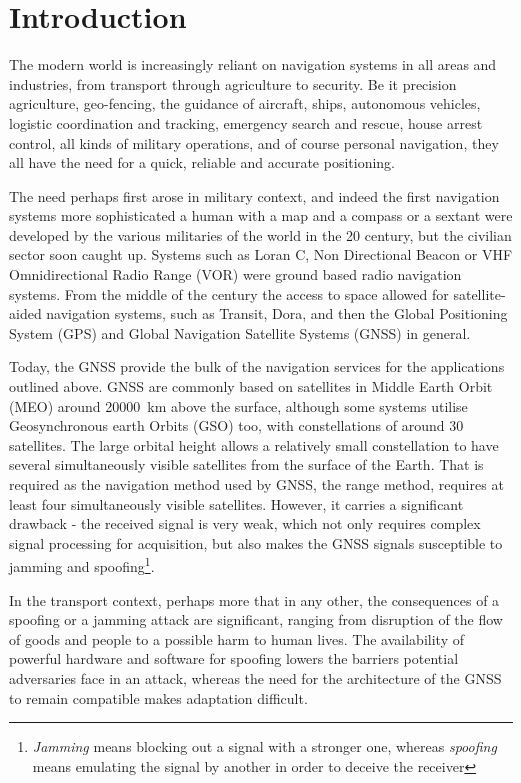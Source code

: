 \chapter{Introduction}
\label{s_int}
The modern world is increasingly reliant on navigation systems in all areas and industries, from transport through agriculture to security. Be it precision agriculture, geo-fencing, the guidance of aircraft, ships, autonomous vehicles, logistic coordination and tracking, emergency search and rescue, house arrest control, all kinds of military operations, and of course personal navigation, they all have the need for a quick, reliable and accurate positioning.

The need perhaps first arose in military context, and indeed the first navigation systems more sophisticated a human with a map and a compass or a sextant were developed by the various militaries of the world in the 20 century, but the civilian sector soon caught up. Systems such as Loran C, Non Directional Beacon or VHF Omnidirectional Radio Range (VOR) were ground based radio navigation systems. From the middle of the century the access to space allowed for satellite-aided navigation systems, such as Transit, Dora, and then the Global Positioning System (GPS) and Global Navigation Satellite Systems (GNSS) in general.

Today, the GNSS provide the bulk of the navigation services for the applications outlined above. GNSS are commonly based on satellites in Middle Earth Orbit (MEO) around \qty{20000}{km} above the surface, although some systems utilise Geosynchronous earth Orbits (GSO) too, with constellations of around 30 satellites. The large orbital height allows a relatively small constellation to have several simultaneously visible satellites from the surface of the Earth. That is required as the navigation method used by GNSS, the range method, requires at least four simultaneously visible satellites. However, it carries a significant drawback - the received signal is very weak, which not only requires complex signal processing for acquisition, but also makes the GNSS signals susceptible to jamming and spoofing\footnote{\textit{Jamming} means blocking out a signal with a stronger one, whereas \textit{spoofing} means emulating the signal by another in order to deceive the receiver}.

In the transport context, perhaps more that in any other, the consequences of a spoofing or a jamming attack are significant, ranging from disruption of the flow of goods and people to a possible harm to human lives. The availability of powerful hardware and software for spoofing lowers the barriers potential adversaries face in an attack, whereas the need for the architecture of the GNSS to remain compatible makes adaptation difficult\cite{int01}.

